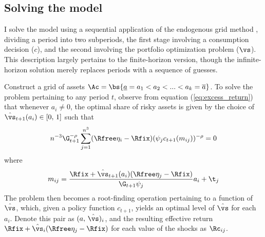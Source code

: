 \subsection{Solving the model}\label{app:seq_egm}

I solve the model using a sequential application of the endogenous grid method \citep{Carroll2006}, dividing a period into two subperiods, the first stage involving a consumption decision ($c$), and the second involving the portfolio optimization problem ($\vs$). This description largely pertains to the finite-horizon version, though the infinite-horizon solution merely replaces periods with a sequence of guesses.

Construct a grid of assets $\Ac = \bs{\underline{a} = a_1 < a_2 < ... < a_k = \overline{a}}$. To solve the problem pertaining to any period $t$, observe from equation (\ref{eq:excess_return}) that whenever $a_i \neq 0$, the optimal share of risky assets is given by the choice of $\hat{\vs}_{t+1}(a_i) \in [0,\,1]$ such that
\begin{equation}\label{eq:kappa}
n^{-3}\G_{t+1}^{-\rho}\sum_{j=1}^{n^3}(\Rfree\eta_i - \Rfix)(\psi_{j}c_{t+1}(m_{ij}))^{-\rho} = 0
\end{equation}
where
\[
m_{ij} = \frac{\Rfix + \hat{\vs}_{t+1}(a_i)(\Rfree\eta_j - \Rfix)}{\G_{t+1}\psi_{j}}a_i + \t_j
\]
The problem then becomes a root-finding operation pertaining to a function of $\hat{\vs}$, which, given a policy function $c_{t+1}$, yields an optimal level of $\hat{\vs}$ for each $a_i$. Denote this pair as $(a,\,\hat{\vs})_{i}$, and the resulting effective return $\Rfix + \hat{\vs}_{i}(\Rfree\eta_{j} - \Rfix)$ for each value of the shocks as $\Rc_{ij}$.

